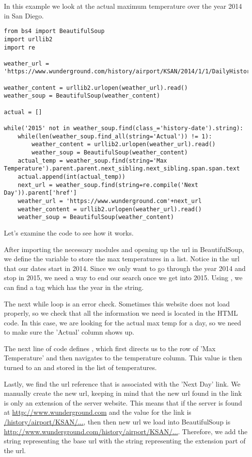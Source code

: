 In this example we look at the actual maximum temperature over the year 2014 in San Diego.
\begin{lstlisting}
from bs4 import BeautifulSoup
import urllib2
import re

weather_url = 'https://www.wunderground.com/history/airport/KSAN/2014/1/1/DailyHistory.html'

weather_content = urllib2.urlopen(weather_url).read()
weather_soup = BeautifulSoup(weather_content)

actual = []

while('2015' not in weather_soup.find(class_='history-date').string):
    while(len(weather_soup.find_all(string='Actual')) != 1):
        weather_content = urllib2.urlopen(weather_url).read()
        weather_soup = BeautifulSoup(weather_content)
    actual_temp = weather_soup.find(string='Max Temperature').parent.parent.next_sibling.next_sibling.span.span.text
    actual.append(int(actual_temp))
    next_url = weather_soup.find(string=re.compile('Next Day')).parent['href']
    weather_url = 'https://www.wunderground.com'+next_url
    weather_content = urllib2.urlopen(weather_url).read()
    weather_soup = BeautifulSoup(weather_content)

\end{lstlisting}
Let's examine the code to see how it works.

After importing the necessary modules and opening up the url in BeautifulSoup, we define the variable  to store the max temperatures in a list.
Notice in the url that our dates start in 2014.
Since we only want to go through the year 2014 and stop in 2015, we need a way to end our search once we get into 2015.
Using , we can find a tag which has the year in the string.

The next while loop is an error check.
Sometimes this website does not load properly, so we check that all the information we need is located in the HTML code.
In this case, we are looking for the actual max temp for a day, so we need to make sure the 'Actual' column shows up.

The next line of code defines , which first directs us to the row of 'Max Temperature' and then navigates to the temperature column.
This value is then turned to an  and stored in the list of temperatures.

Lastly, we find the url reference that is associated with the 'Next Day' link.
We manually create the new url, keeping in mind that the new url found in the link is only an extension of the server website.
This means that if the server is found at \url{http://www.wunderground.com} and the  value for the link is \url{/history/airport/KSAN/...}, then then new url we load into BeautifulSoup is \url{http://www.wunderground.com/history/airport/KSAN/...}.
Therefore, we add the string representing the base url with the string representing the extension part of the url.

